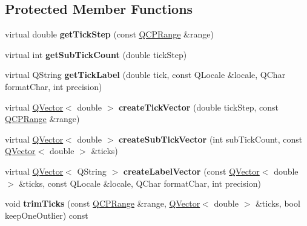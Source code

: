\subsection*{Protected Member Functions}
\begin{DoxyCompactItemize}
\item 
virtual double {\bfseries get\+Tick\+Step} (const \hyperlink{class_q_c_p_range}{Q\+C\+P\+Range} \&range)\hypertarget{class_q_c_p_axis_ticker_a910d69bcec2de37e92d8d4e1ecf201e2}{}\label{class_q_c_p_axis_ticker_a910d69bcec2de37e92d8d4e1ecf201e2}

\item 
virtual int {\bfseries get\+Sub\+Tick\+Count} (double tick\+Step)\hypertarget{class_q_c_p_axis_ticker_a4ccc403ced7a1457ce6ba293509933c8}{}\label{class_q_c_p_axis_ticker_a4ccc403ced7a1457ce6ba293509933c8}

\item 
virtual Q\+String {\bfseries get\+Tick\+Label} (double tick, const Q\+Locale \&locale, Q\+Char format\+Char, int precision)\hypertarget{class_q_c_p_axis_ticker_a8201eb4aa8be192bf786b126eb5ee089}{}\label{class_q_c_p_axis_ticker_a8201eb4aa8be192bf786b126eb5ee089}

\item 
virtual \hyperlink{class_q_vector}{Q\+Vector}$<$ double $>$ {\bfseries create\+Tick\+Vector} (double tick\+Step, const \hyperlink{class_q_c_p_range}{Q\+C\+P\+Range} \&range)\hypertarget{class_q_c_p_axis_ticker_af4645a824c7bd2ca8fc7e86ebf9055bd}{}\label{class_q_c_p_axis_ticker_af4645a824c7bd2ca8fc7e86ebf9055bd}

\item 
virtual \hyperlink{class_q_vector}{Q\+Vector}$<$ double $>$ {\bfseries create\+Sub\+Tick\+Vector} (int sub\+Tick\+Count, const \hyperlink{class_q_vector}{Q\+Vector}$<$ double $>$ \&ticks)\hypertarget{class_q_c_p_axis_ticker_a9a6435723fa0bd366d1ea4c2cff7c33f}{}\label{class_q_c_p_axis_ticker_a9a6435723fa0bd366d1ea4c2cff7c33f}

\item 
virtual \hyperlink{class_q_vector}{Q\+Vector}$<$ Q\+String $>$ {\bfseries create\+Label\+Vector} (const \hyperlink{class_q_vector}{Q\+Vector}$<$ double $>$ \&ticks, const Q\+Locale \&locale, Q\+Char format\+Char, int precision)\hypertarget{class_q_c_p_axis_ticker_a804050e408f37a0b9770c6654ebe6aa7}{}\label{class_q_c_p_axis_ticker_a804050e408f37a0b9770c6654ebe6aa7}

\item 
void {\bfseries trim\+Ticks} (const \hyperlink{class_q_c_p_range}{Q\+C\+P\+Range} \&range, \hyperlink{class_q_vector}{Q\+Vector}$<$ double $>$ \&ticks, bool keep\+One\+Outlier) const \hypertarget{class_q_c_p_axis_ticker_a7eaaf1a0bf7807fe95e36d40e3b3ed65}{}\label{class_q_c_p_axis_ticker_a7eaaf1a0bf7807fe95e36d40e3b3ed65}


\end{DoxyCompactItemize}
